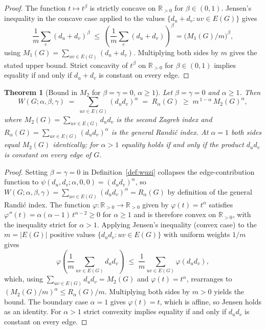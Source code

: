 \documentclass[a5paper, 10pt]{article}
\theoremstyle{plain}
\newtheorem{theorem}{Theorem}
\theoremstyle{remark}
\theoremstyle{definition}
\newcommand{\Wuzi}{W(G;\alpha,\beta,\gamma)}
\begin{document}
\begin{proof}
The function $t \mapsto t^{\beta}$ is strictly concave on
$\mathbb{R}_{> 0}$ for $\beta \in (0, 1)$. Jensen's inequality in
the concave case applied to the values
$\{d_u + d_v : uv \in E(G)\}$ gives
\[
\frac{1}{m} \sum_e (d_u + d_v)^{\beta}
\;\le\;
\left( \frac{1}{m} \sum_e (d_u + d_v) \right)^{\!\beta}
= \bigl( M_1(G) / m \bigr)^{\beta},
\]
using $M_1(G) = \sum_{uv \in E(G)} (d_u + d_v)$. Multiplying both
sides by $m$ gives the stated upper bound. Strict concavity of
$t^{\beta}$ on $\mathbb{R}_{> 0}$ for $\beta \in (0, 1)$ implies
equality if and only if $d_u + d_v$ is constant on every edge.
\end{proof}

\begin{theorem}[Bound in $M_2$ for $\beta = \gamma = 0$, $\alpha \ge 1$]\label{thm:m2_alpha}
Let $\beta = \gamma = 0$ and $\alpha \ge 1$. Then
\[
\Wuzi
\;=\; \sum_{uv \in E(G)} (d_u d_v)^{\alpha}
\;=\; R_{\alpha}(G)
\;\ge\; m^{\,1 - \alpha}\, M_2(G)^{\alpha},
\]
where $M_2(G) = \sum_{uv \in E(G)} d_u d_v$ is the second Zagreb
index and $R_{\alpha}(G) = \sum_{uv \in E(G)} (d_u d_v)^{\alpha}$
is the general Randi\'c index. At $\alpha = 1$ both sides equal
$M_2(G)$ identically; for $\alpha > 1$ equality holds if and only
if the product $d_u d_v$ is constant on every edge of $G$.
\end{theorem}

\begin{proof}
Setting $\beta = \gamma = 0$ in Definition~\ref{def:wuzi} collapses
the edge-contribution function to
$\psi(d_u, d_v; \alpha, 0, 0) = (d_u d_v)^{\alpha}$, so
$\Wuzi = \sum_{uv \in E(G)} (d_u d_v)^{\alpha} = R_{\alpha}(G)$
by definition of the general Randi\'c index. The function
$\varphi : \mathbb{R}_{> 0} \to \mathbb{R}_{> 0}$ given by
$\varphi(t) = t^{\alpha}$ satisfies
$\varphi''(t) = \alpha(\alpha - 1)\, t^{\alpha - 2} \ge 0$ for
$\alpha \ge 1$ and is therefore convex on $\mathbb{R}_{> 0}$, with
the inequality strict for $\alpha > 1$. Applying Jensen's
inequality (convex case) to the $m = |E(G)|$ positive values
$\{d_u d_v : uv \in E(G)\}$ with uniform weights $1/m$ gives
\[
\varphi\!\left(\frac{1}{m}\sum_{uv \in E(G)} d_u d_v\right)
\;\le\;
\frac{1}{m}\sum_{uv \in E(G)} \varphi(d_u d_v),
\]
which, using $\sum_{uv \in E(G)} d_u d_v = M_2(G)$ and
$\varphi(t) = t^{\alpha}$, rearranges to
$(M_2(G)/m)^{\alpha} \le R_{\alpha}(G)/m$. Multiplying both sides
by $m > 0$ yields the bound. The boundary case $\alpha = 1$ gives
$\varphi(t) = t$, which is affine, so Jensen holds as an
identity. For $\alpha > 1$ strict convexity implies equality if
and only if $d_u d_v$ is constant on every edge.
\end{proof}
\end{document}
